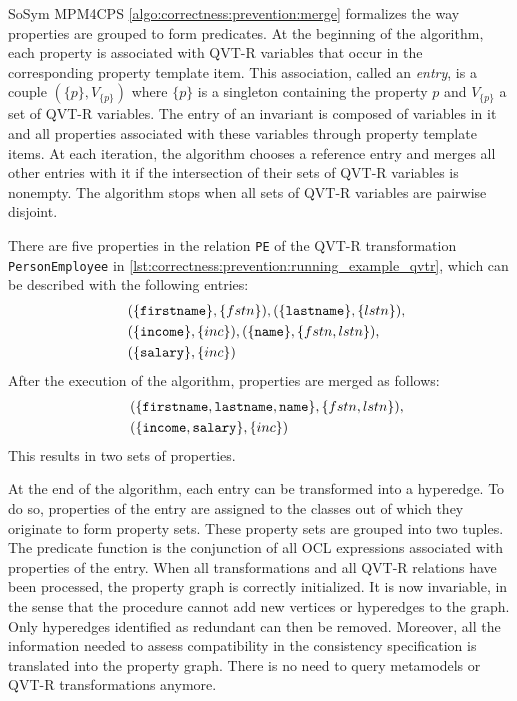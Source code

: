 \begin{copiedFrom}{SoSym MPM4CPS}
\autoref{algo:correctness:prevention:merge} formalizes the way properties are grouped to form predicates. At the beginning of the algorithm, each property is associated with QVT-R variables that occur in the corresponding property template item. This association, called an \textit{entry}, is a couple $(\{p\}, V_{\{p\}})$ where $\{p\}$ is a singleton containing the property $p$ and $V_{\{p\}}$ a set of QVT-R variables. The entry of an invariant is composed of variables in it and all properties associated with these variables through property template items. At each iteration, the algorithm chooses a reference entry and merges all other entries with it if the intersection of their sets of QVT-R variables is nonempty. The algorithm stops when all sets of QVT-R variables are pairwise disjoint.

\begin{example}
There are five properties in the relation \texttt{PE} of the QVT-R transformation \texttt{PersonEmployee} in \autoref{lst:correctness:prevention:running_example_qvtr}, which can be described with the following entries:
\begin{align*}
\hspace{1em}
&(\{\texttt{firstname}\}, \{fstn\}), (\{\texttt{lastname}\}, \{lstn\}),\\ &(\{\texttt{income}\}, \{inc\}), (\{\texttt{name}\}, \{fstn, lstn\}),\\ &(\{\texttt{salary}\}, \{inc\})
\end{align*}
After the execution of the algorithm, properties are merged as follows:
\begin{align*}
\hspace{1em}
&(\{\texttt{firstname}, \texttt{lastname}, \texttt{name}\}, \{fstn, lstn\}),\\
&(\{\texttt{income}, \texttt{salary}\}, \{inc\})
\end{align*}
This results in two sets of properties.
\end{example}

At the end of the algorithm, each entry can be transformed into a hyperedge. To do so, properties of the entry are assigned to the classes out of which they originate to form property sets. These property sets are grouped into two tuples. The predicate function is the conjunction of all OCL expressions associated with properties of the entry.
When all transformations and all QVT-R relations have been processed, the property graph is correctly initialized. It is now invariable, in the sense that the procedure cannot add new vertices or hyperedges to the graph. Only hyperedges identified as redundant can then be removed. Moreover, all the information needed to assess compatibility in the consistency specification is translated into the property graph. There is no need to query metamodels or QVT-R transformations anymore.


\end{copiedFrom}

